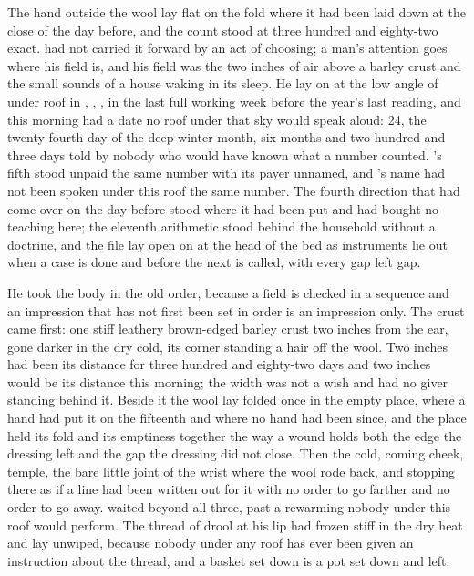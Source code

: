 
The hand outside the wool lay flat on the fold where it had been laid down at the close of the day before, and the count stood at three hundred and eighty-two exact.  had not carried it forward by an act of choosing; a man's attention goes where his field is, and his field was the two inches of air above a barley crust and the small sounds of a house waking in its sleep. He lay on  at the low angle of  under  roof in , , , in the last full working week before the year's last reading, and this morning had a date no roof under that sky would speak aloud:  24, the twenty-fourth day of the deep-winter month, six months and two hundred and three days told by nobody who would have known what a number counted. 's fifth stood unpaid the same number with its payer unnamed, and 's name had not been spoken under this roof the same number. The fourth direction that had come over  on the day before stood where it had been put and had bought no teaching here; the eleventh arithmetic stood behind the household without a doctrine, and the file lay open on  at the head of the bed as instruments lie out when a case is done and before the next is called, with every gap left gap.

He took the body in the old order, because a field is checked in a sequence and an impression that has not first been set in order is an impression only. The crust came first: one stiff leathery brown-edged barley crust two inches from the ear, gone darker in the dry cold, its corner standing a hair off the wool. Two inches had been its distance for three hundred and eighty-two days and two inches would be its distance this morning; the width was not a wish and had no giver standing behind it. Beside it the wool lay folded once in the empty place, where a hand had put it on the fifteenth and where no hand had been since, and the place held its fold and its emptiness together the way a wound holds both the edge the dressing left and the gap the dressing did not close. Then the cold, coming cheek, temple, the bare little joint of the wrist where the wool rode back, and stopping there as if a line had been written out for it with no order to go farther and no order to go away.  waited beyond all three, past a rewarming nobody under this roof would perform. The thread of drool at his lip had frozen stiff in the dry heat and lay unwiped, because nobody under any roof has ever been given an instruction about the thread, and a basket set down is a pot set down and left.

